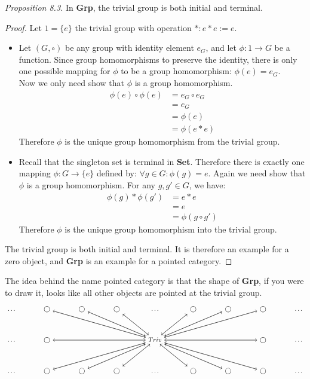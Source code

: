 \textit{Proposition 8.3.} In \textbf{Grp}, the trivial group is both initial and terminal.\begin{proof}

Let $1=\{e\}$ the trivial group with operation $*: e*e := e$.
\begin {itemize}
\item Let $\left({G, \circ}\right)$ be any group with identity element $e_G$,
  and let $\phi: 1 \to G$ be a function.
  Since group homomorphisms to preserve the identity,
  there is only one possible mapping for $\phi$ to be a group homomorphism:
  $\phi (e) = e_G$.\\
  Now we only need show that $\phi$ is a group homomorphism.
  \begin{align*}
    \phi (e) \circ \phi (e) &= e_G \circ e_G \\
                            &= e_G \\
                            &= \phi (e) \\
                            &= \phi (e * e)
  \end{align*}
  Therefore $\phi$ is the unique group homomorphism from the trivial group.
\item Recall that the singleton set is terminal in \textbf{Set}.
  Therefore there is exactly one mapping
  $\phi: G \to \{e\}$ defined by:
  $\forall g \in G: \phi(g) = e$.
  Again we need show that $\phi$ is a group homomorphism.
  For any $g, g' \in G$, we have:
  \begin{align*}
    \phi(g)*\phi(g') &= e * e \\
    &= e \\
    &= \phi (g \circ g')
  \end{align*}
  Therefore $\phi$ is the unique group homomorphism into the trivial group.
\end{itemize}
The trivial group is both initial and terminal. It is therefore an example for a
zero object, and \textbf{Grp} is an example for a pointed category.
\end{proof}
The idea behind the name pointed category is that the shape of \textbf{Grp}, if you were to draw it,
looks like all other objects are pointed at the trivial group.
\[
  \begin{tikzcd}[column sep=large]
    \dots
    & \bigcirc \arrow [drrr, ""]
    & \bigcirc \arrow[drr, ""]
    & \bigcirc \arrow[dr, ""]
    & \dots
    & \bigcirc \arrow[dl, ""]
    & \bigcirc \arrow[dll,""]
    & \bigcirc \arrow[dlll,""]
    & \dots \\[5mm]
    \dots
    & \bigcirc \arrow[rrr, ""]
    & & &
    Triv
    \arrow[dlll, ""]
    \arrow[dll, ""]
    \arrow[dl, ""]
    \arrow[dr, ""]
    \arrow[drr, ""]
    \arrow[drrr, ""]
    \arrow[ulll, ""]
    \arrow[ull, ""]
    \arrow[ul, ""]
    \arrow[ur, ""]
    \arrow[urr, ""]
    \arrow[urrr, ""]
    \arrow[rrr, ""]
    \arrow[lll, ""]
    & &
    &  \bigcirc \arrow[lll, ""]
    & \dots   \\[5mm]
    \dots
    & \bigcirc \arrow [urrr, ""]
    & \bigcirc \arrow[urr, ""]
    & \bigcirc \arrow[ur, ""]
    & \dots
    & \bigcirc \arrow[ul, ""]
    & \bigcirc \arrow[ull,""]
    & \bigcirc \arrow[ulll,""]
    & \dots
  \end{tikzcd}
\]


